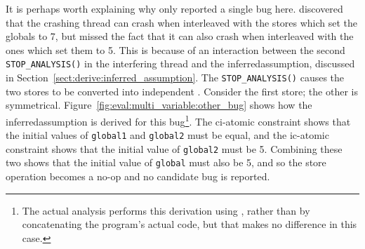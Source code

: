 It is perhaps worth explaining why {\technique} only reported a single
bug here.  {\Technique} discovered that the crashing thread can crash
when interleaved with the stores which set the globals to 7, but
missed the fact that it can also crash when interleaved with the ones
which set them to 5.  This is because of an interaction between the
second \texttt{STOP\_ANALYSIS()} in the interfering thread and the
\gls{inferredassumption}, discussed in
Section~\ref{sect:derive:inferred_assumption}.  The
\texttt{STOP\_ANALYSIS()} causes the two stores to be converted into
independent {\StateMachines}.  Consider the first store; the other is
symmetrical.  Figure~\ref{fig:eval:multi_variable:other_bug} shows how
the \gls{inferredassumption} is derived for this bug\footnote{The
  actual analysis performs this derivation using {\StateMachines},
  rather than by concatenating the program's actual code, but that
  makes no difference in this case.}.  The \gls{ci-atomic} constraint
shows that the initial values of \texttt{global1} and \texttt{global2}
must be equal, and the \gls{ic-atomic} constraint shows that the
initial value of \texttt{global2} must be 5.  Combining these two
shows that the initial value of \texttt{global} must also be 5, and so
the store operation becomes a no-op and no candidate bug is reported.

